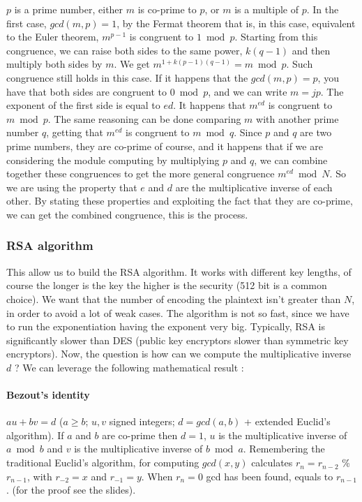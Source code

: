 \documentclass[11pt]{article}
\begin{document}
$p$ is a prime number, either $m$ is co-prime to $p$, or $m$ is a multiple of $p$. In the first case, $gcd(m, p) = 1$, by the Fermat theorem that is, in this case, equivalent to the Euler theorem, $m^{p - 1}$ is congruent to $1 \bmod p$. Starting from this congruence, we can raise both sides to the same power, $k(q - 1)$ and then multiply both sides by $m$. We get $m^{1 + k(p - 1)(q - 1)} = m \bmod p$. Such congruence still holds in this case. If it happens that the $gcd(m, p) = p$, you have that both sides are congruent to $0 \bmod p$, and we can write $m = jp$. The exponent of the first side is equal to $ed$. It happens that $m^{ed}$ is congruent to $m \bmod p$. The same reasoning can be done comparing $m$ with another prime number $q$, getting that $m^{ed}$ is congruent to $m \bmod q$. Since $p$ and $q$ are two prime numbers, they are co-prime of course, and it happens that if we are considering the module computing by multiplying $p$ and $q$, we can combine together these congruences to get the more general congruence $m^{ed} \bmod N$. So we are using the property that $e$ and $d$ are the multiplicative inverse of each other. By stating these properties and exploiting the fact that they are co-prime, we can get the combined congruence, this is the process.
\subsubsection{RSA algorithm}
This allow us to build the RSA algorithm. It works with different key lengths, of course the longer is the key the higher is the security (512 bit is a common choice). We want that the number of encoding the plaintext isn't greater than $N$, in order to avoid a lot of weak cases. The algorithm is not so fast, since we have to run the exponentiation having the exponent very big. Typically, RSA is significantly slower than DES (public key encryptors slower than symmetric key encryptors). Now, the question is how can we compute the multiplicative inverse $d$ ? We can leverage the following mathematical result :
\paragraph{Bezout's identity} $au + bv = d$ ($a \geq b$; $u, v$ signed integers; $d = gcd(a, b)$ + extended Euclid's algorithm). If $a$ and $b$ are co-prime then $d = 1$, $u$ is the multiplicative inverse of $a \bmod b$ and $v$ is the multiplicative inverse of $b \bmod a$. Remembering the traditional Euclid's algorithm, for computing $gcd(x, y)$ calculates $r_n = r_{n - 2}$ \% $ r_{n - 1}$, with $r_{-2} = x$ and $r_{-1} = y$. When $r_n = 0$ gcd has been found, equals to $r_{n - 1}$. (for the proof see the slides).
\end{document}
